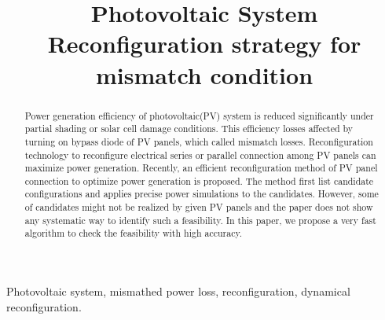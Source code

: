 \documentclass[conference]{IEEEtran}
\begin{document}
\title{Photovoltaic System Reconfiguration strategy for mismatch condition\\
{\footnotesize \textsuperscript{}}}

\author{
\and
{}
\and
{}
}

\maketitle

\begin{abstract}
  Power generation efficiency of photovoltaic(PV) system is reduced significantly under partial shading or solar cell damage  conditions. This efficiency losses affected by turning on bypass diode of PV panels, which called mismatch losses. Reconfiguration technology to reconfigure electrical series or parallel connection among PV panels can maximize power generation. Recently, an efficient reconfiguration method of PV panel connection to optimize power generation is proposed. The method first list candidate configurations and applies precise power simulations to the candidates. However, some of candidates might not be realized by given PV panels and the paper does not show any systematic way to identify such a feasibility. In this paper, we propose a very fast algorithm to check the feasibility with high accuracy.
\end{abstract}

\begin{IEEEkeywords}
  Photovoltaic system, mismathed power loss, reconfiguration, dynamical reconfiguration.
\end{IEEEkeywords}
\end{document}
